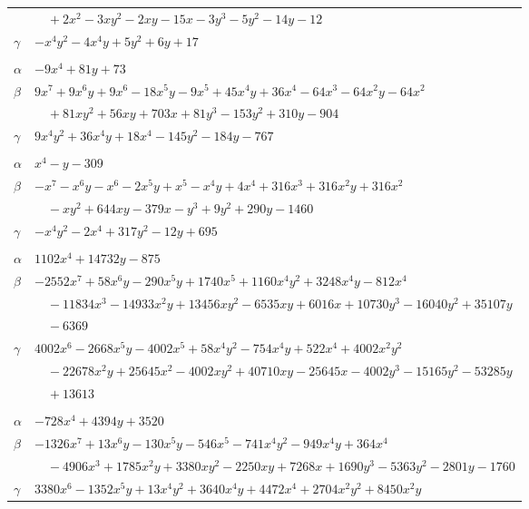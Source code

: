 \documentclass[11pt]{article}
\begin{document}
\begin{longtable}{@{}ll@{}}
 & $\quad +2x^{2}-3xy^{2}-2xy-15x-3y^{3}-5y^{2}-14y-12$\\
$\gamma$ & $-x^{4}y^{2}-4x^{4}y+5y^{2}+6y+17$\\
\addlinespace[3pt]
\multicolumn{2}{@{}l}{$\{i,j\}=\{9,36\}$, $k_{ij}=2^{6}$}\\
$\alpha$ & $-9x^{4}+81y+73$\\
$\beta$ & $9x^{7}+9x^{6}y+9x^{6}-18x^{5}y-9x^{5}+45x^{4}y+36x^{4}-64x^{3}-64x^{2}y-64x^{2}$\\
 & $\quad +81xy^{2}+56xy+703x+81y^{3}-153y^{2}+310y-904$\\
$\gamma$ & $9x^{4}y^{2}+36x^{4}y+18x^{4}-145y^{2}-184y-767$\\
\addlinespace[3pt]
\multicolumn{2}{@{}l}{$\{i,j\}=\{9,39\}$, $k_{ij}=2^{5}\cdot 7\cdot 11$}\\
$\alpha$ & $x^{4}-y-309$\\
$\beta$ & $-x^{7}-x^{6}y-x^{6}-2x^{5}y+x^{5}-x^{4}y+4x^{4}+316x^{3}+316x^{2}y+316x^{2}$\\
 & $\quad -xy^{2}+644xy-379x-y^{3}+9y^{2}+290y-1460$\\
$\gamma$ & $-x^{4}y^{2}-2x^{4}+317y^{2}-12y+695$\\
\addlinespace[3pt]
\multicolumn{2}{@{}l}{$\{i,j\}=\{10,21\}$, $k_{ij}=5^{3}\cdot 7$}\\
$\alpha$ & $1102x^{4}+14732y-875$\\
$\beta$ & $-2552x^{7}+58x^{6}y-290x^{5}y+1740x^{5}+1160x^{4}y^{2}+3248x^{4}y-812x^{4}$\\
 & $\quad -11834x^{3}-14933x^{2}y+13456xy^{2}-6535xy+6016x+10730y^{3}-16040y^{2}+35107y$\\
 & $\quad -6369$\\
$\gamma$ & $4002x^{6}-2668x^{5}y-4002x^{5}+58x^{4}y^{2}-754x^{4}y+522x^{4}+4002x^{2}y^{2}$\\
 & $\quad -22678x^{2}y+25645x^{2}-4002xy^{2}+40710xy-25645x-4002y^{3}-15165y^{2}-53285y$\\
 & $\quad +13613$\\
\addlinespace[3pt]
\multicolumn{2}{@{}l}{$\{i,j\}=\{10,23\}$, $k_{ij}=2^{2}\cdot 5\cdot 7^{2}$}\\
$\alpha$ & $-728x^{4}+4394y+3520$\\
$\beta$ & $-1326x^{7}+13x^{6}y-130x^{5}y-546x^{5}-741x^{4}y^{2}-949x^{4}y+364x^{4}$\\
 & $\quad -4906x^{3}+1785x^{2}y+3380xy^{2}-2250xy+7268x+1690y^{3}-5363y^{2}-2801y-1760$\\
$\gamma$ & $3380x^{6}-1352x^{5}y+13x^{4}y^{2}+3640x^{4}y+4472x^{4}+2704x^{2}y^{2}+8450x^{2}y$\\

\end{longtable}
\end{document}
